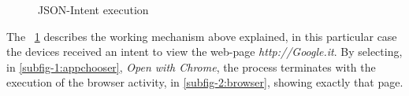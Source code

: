 \begin{figure}[h]
	\centering
	\begin{minipage}{.49\textwidth}\centering
	\end{minipage}
	\begin{minipage}{.49\textwidth}\centering
	\end{minipage}
	\caption{JSON-Intent execution}
	\label{fig:5.4}
\end{figure}
The \figurename~\ref{fig:5.4} describes the working mechanism above explained, in this particular case the devices received an intent to view the web-page \textit{http://Google.it}. By selecting, in \ref{subfig-1:appchooser}, \textit{Open with Chrome}, the process terminates with the execution of the browser activity, in \ref{subfig-2:browser}, showing exactly that page.


